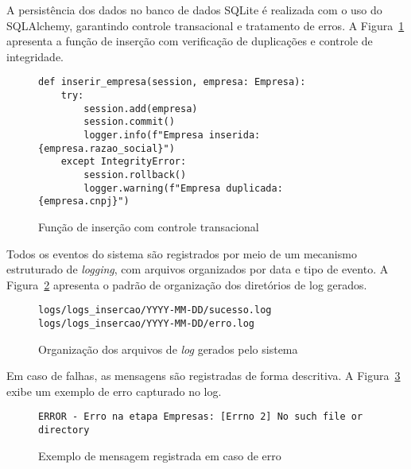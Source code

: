A persistência dos dados no banco de dados SQLite é realizada com o uso do SQLAlchemy, garantindo controle transacional e tratamento de erros. A Figura~\ref{fig:codigo_insercao} apresenta a função de inserção com verificação de duplicações e controle de integridade.

\begin{figure}[!htb]
	\centering
	\caption{Função de inserção com controle transacional}
	\label{fig:codigo_insercao}
	\begin{varwidth}{\linewidth}
		\begin{verbatim}
def inserir_empresa(session, empresa: Empresa):
	try:
		session.add(empresa)
		session.commit()
		logger.info(f"Empresa inserida: {empresa.razao_social}")
	except IntegrityError:
		session.rollback()
		logger.warning(f"Empresa duplicada: {empresa.cnpj}")
		\end{verbatim}
	\end{varwidth}
\end{figure}

Todos os eventos do sistema são registrados por meio de um mecanismo estruturado de \textit{logging}, com arquivos organizados por data e tipo de evento. A Figura~\ref{fig:estrutura_logs} apresenta o padrão de organização dos diretórios de log gerados.

\begin{figure}[!htb]
	\centering
	\caption{Organização dos arquivos de \textit{log} gerados pelo sistema}
	\label{fig:estrutura_logs}
	\begin{varwidth}{\linewidth}
		\begin{verbatim}
logs/logs_insercao/YYYY-MM-DD/sucesso.log
logs/logs_insercao/YYYY-MM-DD/erro.log
		\end{verbatim}
	\end{varwidth}
\end{figure}

Em caso de falhas, as mensagens são registradas de forma descritiva. A Figura~\ref{fig:log_erro} exibe um exemplo de erro capturado no log.

\begin{figure}[!htb]
	\centering
	\caption{Exemplo de mensagem registrada em caso de erro}
	\label{fig:log_erro}
	\begin{varwidth}{\linewidth}
		\begin{verbatim}
ERROR - Erro na etapa Empresas: [Errno 2] No such file or directory
		\end{verbatim}
	\end{varwidth}
\end{figure}

